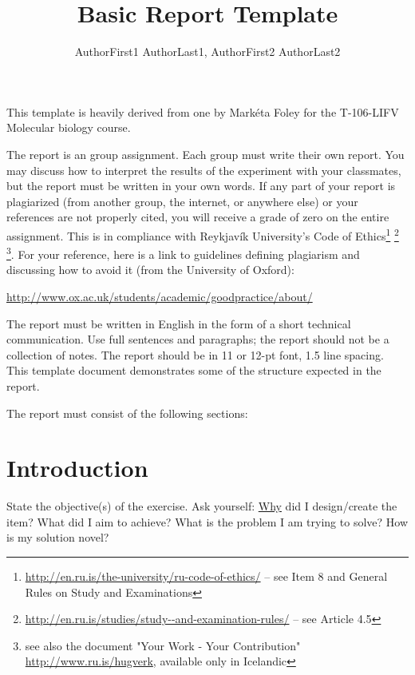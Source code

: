 \documentclass[12pt, svn, draft]{rureport}
\author{AuthorFirst1 AuthorLast1, AuthorFirst2 AuthorLast2}  %
\title{Basic Report Template}  %
\begin{document}
\maketitle  %
\listoffixmes{}
This template is heavily derived from one by Markéta Foley for the
T-106-LIFV Molecular biology course.

The report is an group assignment. Each group must write their own
report. You may discuss how to interpret the results of the experiment
with your classmates, but the report must be written in your own
words. If any part of your report is plagiarized (from another group,
the internet, or anywhere else) or your references are not properly
cited, you will receive a grade of zero on the entire assignment. This
is in compliance with Reykjav\'ik University's Code of
Ethics\footnote{\url{http://en.ru.is/the-university/ru-code-of-ethics/}
  -- see Item 8 and General Rules on Study and Examinations}
\footnote{\url{http://en.ru.is/studies/study--and-examination-rules/}
  -- see Article 4.5} \footnote{see also the document "Your Work -
  Your Contribution" \url{http://www.ru.is/hugverk}, available only in
  Icelandic}. For your reference, here is a link to guidelines
defining plagiarism and discussing how to avoid it (from the
University of Oxford):

\url{http://www.ox.ac.uk/students/academic/goodpractice/about/}

The report must be written in English in the form of a short technical
communication. Use full sentences and paragraphs; the report should
not be a collection of notes. The report should be in 11 or 12-pt
font, 1.5 line spacing.  This template document demonstrates some of
the structure expected in the report.

The report must consist of the following sections:

\section{Introduction} %
State the objective(s) of the exercise. Ask yourself: \underline{Why}
did I design/create the item? What did I aim to achieve? What is the
problem I am trying to solve?  How is my solution novel?
\end{document}
